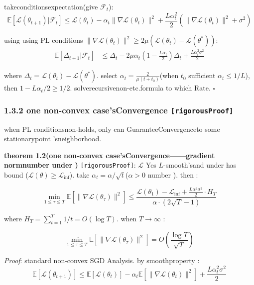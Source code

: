 \documentclass[
  12pt,
]{article}
\begin{document}
takeconditionsexpectation(give  \(\mathcal{F}_t\)):
\[\mathbb{E}[\mathcal{L}(\theta_{t+1}) | \mathcal{F}_t] \leq \mathcal{L}(\theta_t) - \alpha_t \|\nabla\mathcal{L}(\theta_t)\|^2 + \frac{L\alpha_t^2}{2}(\|\nabla\mathcal{L}(\theta_t)\|^2 + \sigma^2)\]

using using  PL conditions
\(\|\nabla\mathcal{L}(\theta_t)\|^2 \geq 2\mu(\mathcal{L}(\theta_t) - \mathcal{L}(\theta^*))\): 
\begin{align*}
\mathbb{E}[\Delta_{t+1} | \mathcal{F}_t] &\leq \Delta_t - 2\mu\alpha_t\left(1 - \frac{L\alpha_t}{2}\right)\Delta_t + \frac{L\alpha_t^2\sigma^2}{2}
\end{align*}

where \(\Delta_t = \mathcal{L}(\theta_t) - \mathcal{L}(\theta^*)\). select
\(\alpha_t = \frac{2}{\mu(t+t_0)}\)(when  \(t_0\) sufficient
\(\alpha_t \leq 1/L\)), then 
\(1 - L\alpha_t/2 \geq 1/2\). solverecursivenon-etc.formula to which Rate. \(\square\)

\subsubsection{\texorpdfstring{1.3.2 one non-convex case'sConvergence
\texttt{{[}rigorousProof{]}}}{1.3.2 one non-convex case'sConvergence {[}rigorousProof{]}}}\label{ux4e00ux822cux975eux51f8ux60c5ux5f62ux7684ux6536ux655b-ux4e25ux683cux8bc1ux660e}

when  PL conditionsnon-holds, only can GuaranteeConvergenceto some stationarypoint 'sneighborhood. 

\textbf{theorem  1.2(one non-convex case'sConvergence------gradient normnumber under )}
\texttt{{[}rigorousProof{]}}:  \(\mathcal{L}\) Yes
\(L\)-smooth'sand under has bound (\(\mathcal{L}(\theta) \geq \mathcal{L}_{\inf}\)). take
\(\alpha_t = \alpha / \sqrt{t}\)(\(\alpha > 0\) number ). then : 

\[\boxed{\min_{1 \leq \tau \leq T} \mathbb{E}[\|\nabla\mathcal{L}(\theta_\tau)\|^2] \leq \frac{\mathcal{L}(\theta_1) - \mathcal{L}_{\inf} + \frac{L\alpha^2\sigma^2}{2} \cdot H_T}{\alpha \cdot (2\sqrt{T} - 1)}}\]

where \(H_T = \sum_{t=1}^{T} 1/t = O(\log T)\). when  \(T \to \infty\) : 

\[\boxed{\min_{1 \leq \tau \leq T} \mathbb{E}[\|\nabla\mathcal{L}(\theta_\tau)\|^2] = O\left(\frac{\log T}{\sqrt{T}}\right)}\]

\emph{Proof}: standard non-convex SGD Analysis. by smoothproperty : 
\[\mathbb{E}[\mathcal{L}(\theta_{t+1})] \leq \mathbb{E}[\mathcal{L}(\theta_t)] - \alpha_t \mathbb{E}[\|\nabla\mathcal{L}(\theta_t)\|^2] + \frac{L\alpha_t^2\sigma^2}{2}\]
\end{document}
